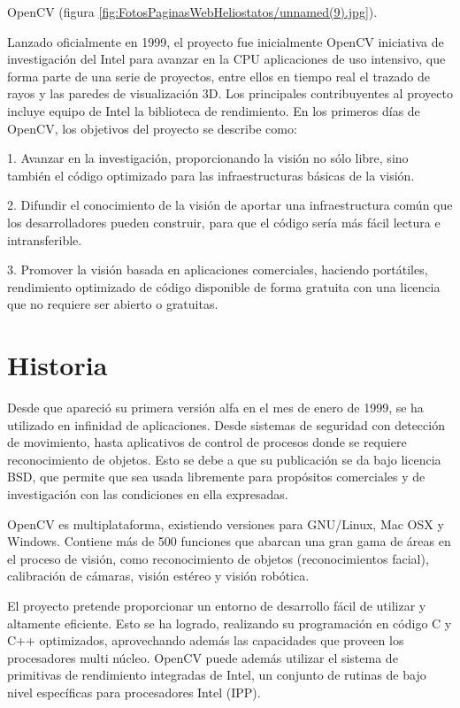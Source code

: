 OpenCV (figura \ref{fig:FotosPaginasWebHeliostatos/unnamed(9).jpg}).

Lanzado oficialmente en 1999, el proyecto fue inicialmente OpenCV iniciativa de investigación del Intel para avanzar en la CPU aplicaciones de uso intensivo, que forma parte de una serie de proyectos, entre ellos en tiempo real el trazado de rayos y las paredes de visualización 3D. Los principales contribuyentes al proyecto incluye equipo de Intel la biblioteca de rendimiento. En los primeros días de OpenCV, los objetivos del proyecto se describe como:

1. Avanzar en la investigación, proporcionando la visión no sólo libre, sino también el código optimizado para las infraestructuras básicas de la visión.

2. Difundir el conocimiento de la visión de aportar una infraestructura común que los desarrolladores pueden construir, para que el código sería más fácil lectura e intransferible.

3. Promover la visión basada en aplicaciones comerciales, haciendo portátiles, rendimiento optimizado de código disponible de forma gratuita con una licencia que no requiere ser abierto o gratuitas.

\section{Historia}

Desde que apareció su primera versión alfa en el mes de enero de 1999, se ha utilizado en infinidad de aplicaciones. Desde sistemas de seguridad con detección de movimiento, hasta aplicativos de control de procesos donde se requiere reconocimiento de objetos. Esto se debe a que su publicación se da bajo licencia BSD, que permite que sea usada libremente para propósitos comerciales y de investigación con las condiciones en ella expresadas.

OpenCV es multiplataforma, existiendo versiones para GNU/Linux, Mac OSX y Windows. Contiene más de 500 funciones que abarcan una gran gama de áreas en el proceso de visión, como reconocimiento de objetos (reconocimientos facial), calibración de cámaras, visión estéreo y visión robótica.

El proyecto pretende proporcionar un entorno de desarrollo fácil de utilizar y altamente eficiente. Esto se ha logrado, realizando su programación en código C y C++ optimizados, aprovechando además las capacidades que proveen los procesadores multi núcleo. OpenCV puede además utilizar el sistema de primitivas de rendimiento integradas de Intel, un conjunto de rutinas de bajo nivel específicas para procesadores Intel (IPP).

